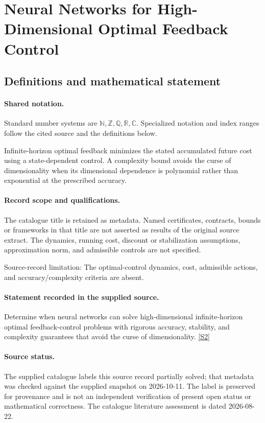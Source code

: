 \documentclass[11pt]{article}
\newcommand{\sref}[2]{\hyperlink{source:#1:#2}{[S#2]}}
\begin{document}
\section{Neural Networks for High-Dimensional Optimal Feedback Control}\label{statement}

\subsection{Definitions and mathematical statement}

\paragraph{Shared notation.}Standard number systems are $\mathbb N,\mathbb Z,\mathbb Q,\mathbb R,\mathbb C$. Specialized notation and index ranges follow the cited source and the definitions below.


Infinite-horizon optimal feedback minimizes the stated accumulated future cost using a state-dependent control. A complexity bound avoids the curse of dimensionality when its dimensional dependence is polynomial rather than exponential at the prescribed accuracy.
\paragraph{Record scope and qualifications.}
The catalogue title is retained as metadata. Named certificates, contracts, bounds or frameworks in that title are not asserted as results of the original source extract.
The dynamics, running cost, discount or stabilization assumptions, approximation norm, and admissible controls are not specified.

Source-record limitation: The optimal-control dynamics, cost, admissible actions, and accuracy/complexity criteria are absent.
\paragraph{Statement recorded in the supplied source.}
Determine when neural networks can solve high-dimensional infinite-horizon optimal feedback-control problems with rigorous accuracy, stability, and complexity guarantees that avoid the curse of dimensionality. \sref{statement}{2}
\paragraph{Source status.}
The supplied catalogue labels this source record partially solved; that metadata was checked against the supplied snapshot on 2026-10-11. The label is preserved for provenance and is not an independent verification of present open status or mathematical correctness. The catalogue literature assessment is dated 2026-08-22.
\end{document}
